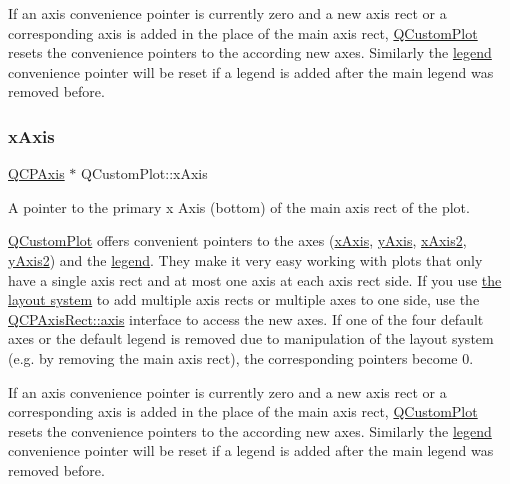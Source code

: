 If an axis convenience pointer is currently zero and a new axis rect or a corresponding axis is added in the place of the main axis rect, \hyperlink{classQCustomPlot}{Q\+Custom\+Plot} resets the convenience pointers to the according new axes. Similarly the \hyperlink{classQCustomPlot_a4eadcd237dc6a09938b68b16877fa6af}{legend} convenience pointer will be reset if a legend is added after the main legend was removed before. \mbox{\label{classQCustomPlot_a9a79cd0158a4c7f30cbc702f0fd800e4}} 
\subsubsection{\texorpdfstring{x\+Axis}{xAxis}}
{\footnotesize\ttfamily \hyperlink{classQCPAxis}{Q\+C\+P\+Axis} $\ast$ Q\+Custom\+Plot\+::x\+Axis}

A pointer to the primary x Axis (bottom) of the main axis rect of the plot.

\hyperlink{classQCustomPlot}{Q\+Custom\+Plot} offers convenient pointers to the axes (\hyperlink{classQCustomPlot_a9a79cd0158a4c7f30cbc702f0fd800e4}{x\+Axis}, \hyperlink{classQCustomPlot_af6fea5679725b152c14facd920b19367}{y\+Axis}, \hyperlink{classQCustomPlot_ada41599f22cad901c030f3dcbdd82fd9}{x\+Axis2}, \hyperlink{classQCustomPlot_af13fdc5bce7d0fabd640f13ba805c0b7}{y\+Axis2}) and the \hyperlink{classQCustomPlot_a4eadcd237dc6a09938b68b16877fa6af}{legend}. They make it very easy working with plots that only have a single axis rect and at most one axis at each axis rect side. If you use \hyperlink{}{the layout system} to add multiple axis rects or multiple axes to one side, use the \hyperlink{classQCPAxisRect_a583ae4f6d78b601b732183f6cabecbe1}{Q\+C\+P\+Axis\+Rect\+::axis} interface to access the new axes. If one of the four default axes or the default legend is removed due to manipulation of the layout system (e.\+g. by removing the main axis rect), the corresponding pointers become 0.

If an axis convenience pointer is currently zero and a new axis rect or a corresponding axis is added in the place of the main axis rect, \hyperlink{classQCustomPlot}{Q\+Custom\+Plot} resets the convenience pointers to the according new axes. Similarly the \hyperlink{classQCustomPlot_a4eadcd237dc6a09938b68b16877fa6af}{legend} convenience pointer will be reset if a legend is added after the main legend was removed before. \mbox{\label{classQCustomPlot_ada41599f22cad901c030f3dcbdd82fd9}} 
